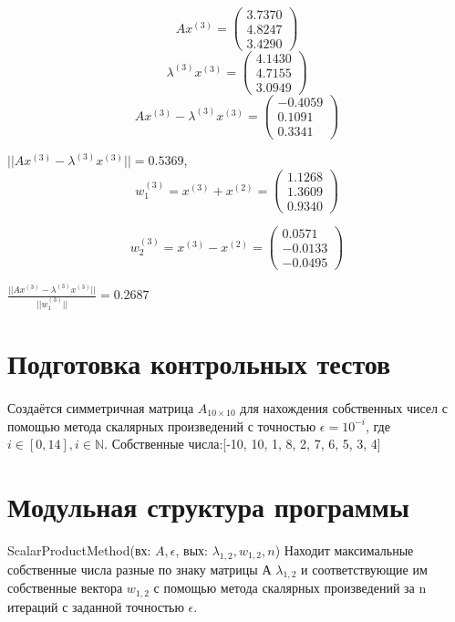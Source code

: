 \documentclass{article}
\begin{document}
	\[Ax^{(3)} =							
	\left(
	\begin{array}{ccc}
		3.7370 \\
		4.8247 \\
		3.4290
	\end{array}
	\right) \]
	\[\lambda^{(3)} x^{(3)} =							
	\left(
	\begin{array}{ccc}
		4.1430 \\
		4.7155 \\
		3.0949
	\end{array}
	\right) \]
	\[Ax^{(3)} - \lambda^{(3)} x^{(3)} =							
	\left(
	\begin{array}{ccc}
		-0.4059 \\
		0.1091 \\
		0.3341
	\end{array}
	\right) \]
	
	$||Ax^{(3)} - \lambda^{(3)} x^{(3)}|| = 0.5369$,
	\[w^{(3)}_1 = x^{(3)} +  x^{(2)}=							
	\left(
	\begin{array}{ccc}
		1.1268  \\
		1.3609  \\
		0.9340
	\end{array}
	\right) \]
	
	\[w^{(3)}_2 = x^{(3)} -  x^{(2)}=							
	\left(
	\begin{array}{ccc}
		0.0571  \\
		-0.0133  \\
		-0.0495
	\end{array}
	\right) \]
	
	$\frac{||Ax^{(3)} - \lambda^{(3)} x^{(3)}||}{||w^{(3)}_1||} = 0.2687$
	
	
	
	\section{Подготовка контрольных тестов}
	\paragraph{}Создаётся симметричная матрица  $A_{10 \times 10}$  для нахождения собственных чисел с помощью метода скалярных произведений с точностью  $\epsilon=10^{-i}$, где $i \in [0, 14], i \in \mathbb {N} $. 
	Собственные числа:[-10, 10, 1, 8, 2, 7, 6, 5, 3, 4]
	
	\section{Модульная структура программы}
	ScalarProductMethod(вх: $A, \epsilon$, вых: $\lambda_{1,2}, w_{1,2}, n$) Находит  максимальные собственные числа разные по знаку матрицы А  $\lambda_{1,2}$ и соответствующие им собственные вектора $w_{1,2}$ с помощью метода скалярных произведений за n итераций с заданной точностью $\epsilon$.
	
\end{document}
